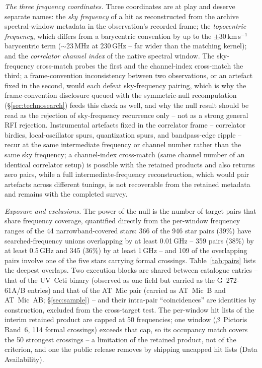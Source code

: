 \documentclass{openjournal}
\begin{document}
\emph{The three frequency coordinates.} Three coordinates are at play
and deserve separate names: the \emph{sky frequency} of a hit as
reconstructed from the archive spectral-window metadata in the
observation's recorded frame; the \emph{topocentric frequency}, which
differs from a barycentric convention by up to the $\pm$30\,km\,s$^{-1}$
barycentric term ($\sim$23\,MHz at 230\,GHz -- far wider than the
matching kernel); and the \emph{correlator channel index} of the
native spectral window. The sky-frequency cross-match probes the first
and the channel-index cross-match the third; a frame-convention
inconsistency between two observations, or an artefact fixed in the
second, would each defeat sky-frequency pairing, which is why the
frame-convention disclosure queued with the symmetric-null
recomputation (\S\ref{sec:technosearch}) feeds this check as well, and
why the null result should be read as the rejection of sky-frequency
recurrence only -- not as a strong general RFI rejection. Instrumental
artefacts fixed in the correlator frame -- correlator birdies,
local-oscillator spurs, quantization spurs, and bandpass-edge ripple
-- recur at the same intermediate frequency or channel number rather
than the same sky frequency; a channel-index cross-match (same channel
number of an identical correlator setup) is possible with the retained
products and also returns zero pairs, while a full intermediate-frequency
reconstruction, which would pair artefacts across different tunings,
is not recoverable from the retained metadata and remains with the
completed survey.

\emph{Exposure and exclusions.} The power of the null is the number of
target pairs that share frequency coverage, quantified directly from
the per-window frequency ranges of the 44 narrowband-covered stars:
366 of the 946 star pairs (39\%) have searched-frequency unions
overlapping by at least 0.01\,GHz -- 359 pairs (38\%) by at least
0.5\,GHz and 345 (36\%) by at least 1\,GHz -- and 109 of the
overlapping pairs involve one of the five stars carrying formal
crossings.
Table~\ref{tab:pairs} lists the deepest overlaps. Two execution blocks
are shared between catalogue entries -- that of the UV~Ceti binary
(observed as one field but carried as the G~272-61A/B entries) and
that of the AT~Mic pair (carried as AT~Mic~B and AT~Mic~AB;
\S\ref{sec:sample}) -- and their intra-pair ``coincidences'' are
identities by construction, excluded from the cross-target test. The
per-window hit lists of the interim retained product are capped at 50
frequencies; one window ($\beta$~Pictoris Band~6, 114 formal
crossings)
exceeds that cap, so its occupancy match covers the 50 strongest
crossings
-- a limitation of the retained product, not of the criterion, and one
the public release removes by shipping uncapped hit lists (Data
Availability).
\end{document}
